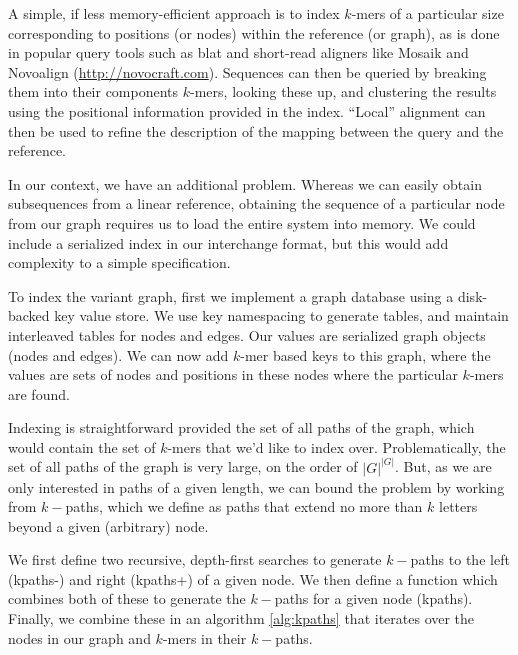 \documentclass{article}
\begin{document}
A simple, if less memory-efficient approach is to index $k$-mers of a particular size corresponding to positions (or nodes) within the reference (or graph), as is done in popular query tools such as blat \cite{kent2002blat} and short-read aligners like Mosaik \cite{lee2014mosaik} and Novoalign (\url{http://novocraft.com}).
Sequences can then be queried by breaking them into their components $k$-mers, looking these up, and clustering the results using the positional information provided in the index.
``Local'' alignment can then be used to refine the description of the mapping between the query and the reference.

In our context, we have an additional problem. Whereas we can easily obtain subsequences from a linear reference, obtaining the sequence of a particular node from our graph requires us to load the entire system into memory. We could include a serialized index in our interchange format, but this would add complexity to a simple specification.

To index the variant graph, first we implement a graph database using a disk-backed key value store. We use key namespacing to generate tables, and maintain interleaved tables for nodes and edges. Our values are serialized graph objects (nodes and edges). We can now add $k$-mer based keys to this graph, where the values are sets of nodes and positions in these nodes where the particular $k$-mers are found.

Indexing is straightforward provided the set of all paths of the graph, which would contain the set of $k$-mers that we'd like to index over. Problematically, the set of all paths of the graph is very large, on the order of $|G|^{|G|}$. But, as we are only interested in paths of a given length, we can bound the problem by working from $k-$paths, which we define as paths that extend no more than $k$ letters beyond a given (arbitrary) node.

We first define two recursive, depth-first searches to generate $k-$paths to the left (kpaths-) and right (kpaths+) of a given node. We then define a function which combines both of these to generate the $k-$paths for a given node (kpaths).
Finally, we combine these in an algorithm \ref{alg:kpaths} that iterates over the nodes in our graph and $k$-mers in their $k-$paths.
\end{document}
